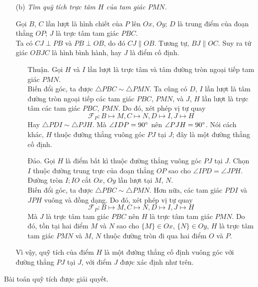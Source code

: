 \begin{solution}
\begin{enumerate}
            \item[(b)] \textit{Tìm quỹ tích trực tâm \(H\) của tam giác \(PMN\).}

            Gọi \(B\), \(C\) lần lượt là hình chiết của \(P\) lên \(Ox\), \(Oy\); \(D\) là trung điểm của đoạn thẳng \(OP\); \(J\) là trực tâm tam giác \(PBC\).\\
            Ta có \(CJ \perp PB\) và \(PB \perp OB\), do đó \(CJ \parallel OB\). Tương tự, \(BJ \parallel OC\). Suy ra tứ giác \(OBJC\) là hình bình hành, hay \(J\) là điểm cố định.

            \begin{enumerate}[leftmargin=1.25cm]
            
                \item[Thuận.] Gọi \(H\) và \(I\) lần lượt là trực tâm và tâm đường tròn ngoại tiếp tam giác \(PMN\).\\
                Biến đổi góc, ta được \(\triangle PBC \sim \triangle PMN\). Ta cũng có \(D\), \(I\) lần lượt là tâm đường tròn ngoại tiếp các tam giác \(PBC\), \(PMN\), và \(J\), \(H\) lần lượt là trực tâm các tam giác \(PBC\), \(PMN\). Do đó, xét phép vị tự quay
                \[\mathcal{F}_{P}: B \mapsto M, C \mapsto N, D \mapsto I, J \mapsto H\]
                Hay \(\triangle PDI \sim \triangle PJH\). Mà \(\angle IDP = 90 \degree\) nên \(\angle PJH = 90 \degree\). Nói cách khác, \(H\) thuộc đường thẳng vuông góc \(PJ\) tại \(J\); đây là một đường thẳng cố định.

                \item[Đảo.] Gọi \(H\) là điểm bất kì thuộc đường thẳng vuông góc \(PJ\) tại \(J\). Chọn \(I\) thuộc đường trung trực của đoạn thẳng \(OP\) sao cho \(\angle IPD = \angle JPH\). Đường tròn \(I;IO\) cắt \(Ox\), \(Oy\) lần lượt tại \(M\), \(N\).\\
                Biến đổi góc, ta được \(\triangle PBC \sim \triangle PMN\). Hơn nữa, các tam giác \(PDI\) và \(JPH\) vuông và đồng dạng. Do đó, xét phép vị tự quay
                \[\mathcal{F}_{P}: B \mapsto M, C \mapsto N, D \mapsto I, J \mapsto H\]
                Mà \(J\) là trực tâm tam giác \(PBC\) nên \(H\) là trực tâm tam giác \(PMN\). Do đó, tồn tại hai điểm \(M\) và \(N\) sao cho \(\{M\} \in Ox\), \(\{N\} \in Oy\), \(H\) là trực tâm tam giác \(PMN\) và \(M\), \(N\) thuộc đường tròn đi qua hai điểm \(O\) và \(P\).
            
            \end{enumerate}

            Vì vậy, quỹ tích của điểm \(H\) là một đường thẳng cố định vuông góc với đường thẳng \(PJ\) tại \(J\), với điểm \(J\) được xác định như trên.
            
        \end{enumerate}

    Bài toán quỹ tích được giải quyết.
    \end{solution}

